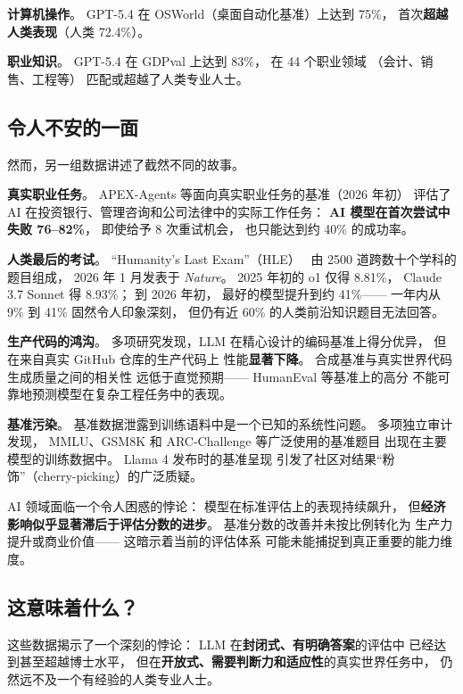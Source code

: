 \textbf{计算机操作}。
GPT-5.4 在 OSWorld（桌面自动化基准）上达到 75\%，
首次\textbf{超越人类表现}（人类 72.4\%）。

\textbf{职业知识}。
GPT-5.4 在 GDPval 上达到 83\%，
在 44 个职业领域
（会计、销售、工程等）
匹配或超越了人类专业人士。

\subsection{令人不安的一面}

然而，另一组数据讲述了截然不同的故事。

\textbf{真实职业任务}。
APEX-Agents 等面向真实职业任务的基准（2026 年初）
评估了 AI 在投资银行、管理咨询和公司法律中的实际工作任务：
\textbf{AI 模型在首次尝试中失败 76--82\%}，
即使给予 8 次重试机会，
也只能达到约 40\% 的成功率。

\textbf{人类最后的考试}。
``Humanity's Last Exam''（HLE）~\cite{hle2026nature}
由 2500 道跨数十个学科的题目组成，
2026 年 1 月发表于 \textit{Nature}。
2025 年初的 o1 仅得 8.81\%，
Claude 3.7 Sonnet 得 8.93\%；
到 2026 年初，
最好的模型提升到约 41\%——
一年内从 9\% 到 41\% 固然令人印象深刻，
但仍有近 60\% 的人类前沿知识题目无法回答。

\textbf{生产代码的鸿沟}。
多项研究发现，LLM 在精心设计的编码基准上得分优异，
但在来自真实 GitHub 仓库的生产代码上
性能\textbf{显著下降}。
合成基准与真实世界代码生成质量之间的相关性
远低于直觉预期——
HumanEval 等基准上的高分
不能可靠地预测模型在复杂工程任务中的表现。

\textbf{基准污染}。
基准数据泄露到训练语料中是一个已知的系统性问题。
多项独立审计发现，
MMLU、GSM8K 和 ARC-Challenge 等广泛使用的基准题目
出现在主要模型的训练数据中。
Llama 4 发布时的基准呈现
引发了社区对结果``粉饰''（cherry-picking）的广泛质疑。

\begin{warnbox}
AI 领域面临一个令人困惑的悖论：
模型在标准评估上的表现持续飙升，
但\textbf{经济影响似乎显著滞后于评估分数的进步}。
基准分数的改善并未按比例转化为
生产力提升或商业价值——
这暗示着当前的评估体系
可能未能捕捉到真正重要的能力维度。
\end{warnbox}

\subsection{这意味着什么？}

这些数据揭示了一个深刻的悖论：
LLM 在\textbf{封闭式、有明确答案}的评估中
已经达到甚至超越博士水平，
但在\textbf{开放式、需要判断力和适应性}的真实世界任务中，
仍然远不及一个有经验的人类专业人士。

